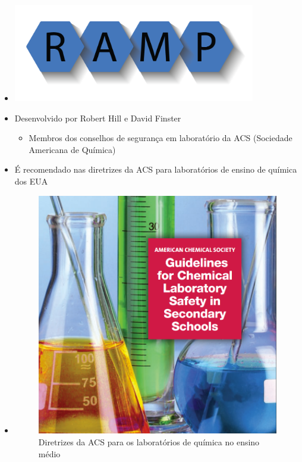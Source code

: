 \documentclass[
  letterpaper,
  DIV=11,
  numbers=noendperiod]{scrartcl}
\providecommand{\tightlist}{%
  \setlength{\itemsep}{0pt}\setlength{\parskip}{0pt}}\usepackage{longtable,booktabs,array}
\begin{document}
\begin{itemize}
\tightlist
\item
  \includegraphics[width=4.16667in,height=\textheight,keepaspectratio]{imagens/RAMP.png}
\item
  Desenvolvido por Robert Hill e David Finster

  \begin{itemize}
  \tightlist
  \item
    Membros dos conselhos de segurança em laboratório da ACS (Sociedade
    Americana de Química)
  \end{itemize}
\item
  É recomendado nas diretrizes da ACS para laboratórios de ensino de
  química dos EUA
\end{itemize}

\begin{itemize}
\item
  \begin{figure}[H]

  {\centering \includegraphics[width=4.375in,height=\textheight,keepaspectratio]{imagens/acs-gss.png}

  }

  \caption{Diretrizes da ACS para os laboratórios de química no ensino
  médio}

  \end{figure}%
\end{itemize}
\end{document}
